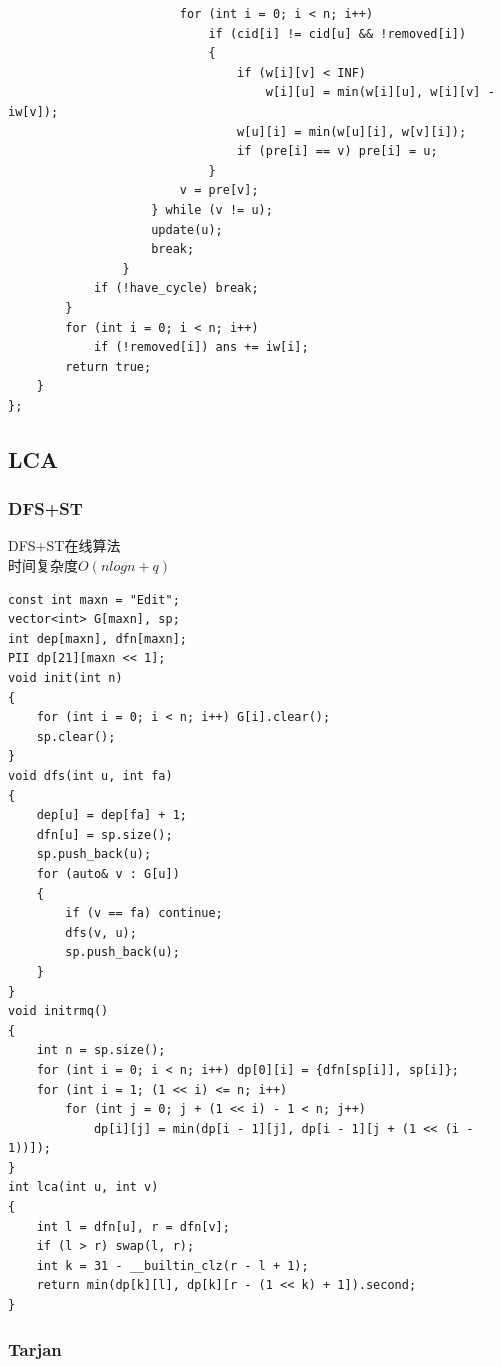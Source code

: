 \documentclass[twoside]{article}
\begin{document}
\begin{lstlisting}
                        for (int i = 0; i < n; i++)
                            if (cid[i] != cid[u] && !removed[i])
                            {
                                if (w[i][v] < INF)
                                    w[i][u] = min(w[i][u], w[i][v] - iw[v]);
                                w[u][i] = min(w[u][i], w[v][i]);
                                if (pre[i] == v) pre[i] = u;
                            }
                        v = pre[v];
                    } while (v != u);
                    update(u);
                    break;
                }
            if (!have_cycle) break;
        }
        for (int i = 0; i < n; i++)
            if (!removed[i]) ans += iw[i];
        return true;
    }
};\end{lstlisting}
\subsection{LCA}
\subsubsection{DFS+ST}

DFS+ST在线算法\\
时间复杂度$O(nlogn+q)$
\begin{lstlisting}
const int maxn = "Edit";
vector<int> G[maxn], sp;
int dep[maxn], dfn[maxn];
PII dp[21][maxn << 1];
void init(int n)
{
    for (int i = 0; i < n; i++) G[i].clear();
    sp.clear();
}
void dfs(int u, int fa)
{
    dep[u] = dep[fa] + 1;
    dfn[u] = sp.size();
    sp.push_back(u);
    for (auto& v : G[u])
    {
        if (v == fa) continue;
        dfs(v, u);
        sp.push_back(u);
    }
}
void initrmq()
{
    int n = sp.size();
    for (int i = 0; i < n; i++) dp[0][i] = {dfn[sp[i]], sp[i]};
    for (int i = 1; (1 << i) <= n; i++)
        for (int j = 0; j + (1 << i) - 1 < n; j++)
            dp[i][j] = min(dp[i - 1][j], dp[i - 1][j + (1 << (i - 1))]);
}
int lca(int u, int v)
{
    int l = dfn[u], r = dfn[v];
    if (l > r) swap(l, r);
    int k = 31 - __builtin_clz(r - l + 1);
    return min(dp[k][l], dp[k][r - (1 << k) + 1]).second;
}
\end{lstlisting}
\subsubsection{Tarjan}
\end{document}
